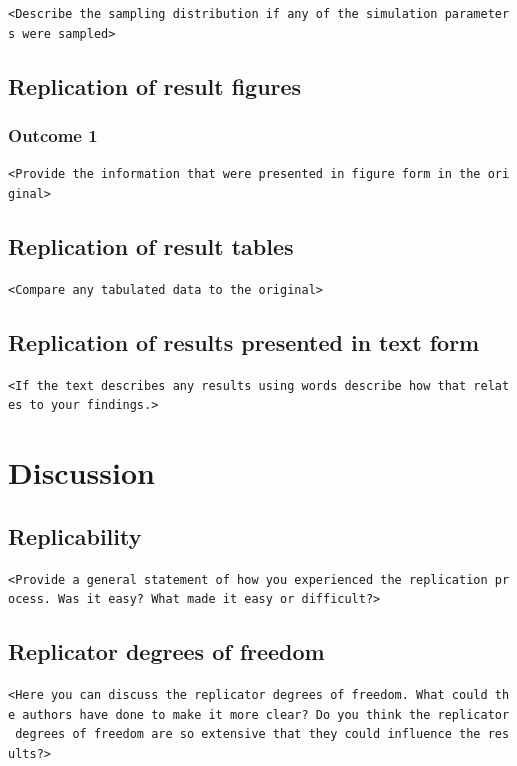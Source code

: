 \documentclass[10,a4paperpaper,]{article}
\begin{document}
\texttt{\textless{}Describe\ the\ sampling\ distribution\ if\ any\ of\ the\ simulation\ parameters\ were\ sampled\textgreater{}}

\subsection{Replication of result figures}
\subsubsection{Outcome 1}

\texttt{\textless{}Provide\ the\ information\ that\ were\ presented\ in\ figure\ form\ in\ the\ original\textgreater{}}

\subsection{Replication of result tables}

\texttt{\textless{}Compare\ any\ tabulated\ data\ to\ the\ original\textgreater{}}

\subsection{Replication of results presented in text form }

\texttt{\textless{}If\ the\ text\ describes\ any\ results\ using\ words\ describe\ how\ that\ relates\ to\ your\ findings.\textgreater{}}

\FloatBarrier
\section{Discussion}

\subsection{Replicability}

\texttt{\textless{}Provide\ a\ general\ statement\ of\ how\ you\ experienced\ the\ replication\ process.\ Was\ it\ easy?\ What\ made\ it\ easy\ or\ difficult?\textgreater{}}

\subsection{Replicator degrees of freedom}

\texttt{\textless{}Here\ you\ can\ discuss\ the\ replicator\ degrees\ of\ freedom.\ What\ could\ the\ authors\ have\ done\ to\ make\ it\ more\ clear?\ Do\ you\ think\ the\ replicator\ degrees\ of\ freedom\ are\ so\ extensive\ that\ they\ could\ influence\ the\ results?\textgreater{}}
\end{document}
